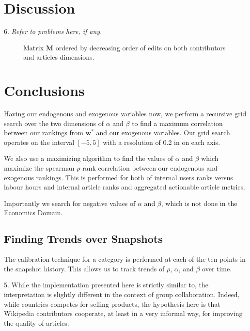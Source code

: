\documentclass{acm_proc_article-sp}
\begin{document}
\section{Discussion}

6. {\it Refer to problems here, if any.}




\begin{figure}
\centering
\caption{Matrix $\mathbf{M}$ ordered by decreasing order of edits on both contributors and articles dimensions.}
\label{fig:matrix}
\end{figure}

\section{Conclusions}


%
Having our endogenous and exogenous variables now, we perform a recursive grid search over the two dimensions of $\alpha$ and $\beta$ to find a maximum correlation between our rankings from $\mathbf{w^*}$ and our exogenous variables. Our grid search operates on the interval $[-5,5]$ with a resolution of 0.2 in on each axis.


We also use a maximizing algorithm to find the values of $\alpha$ and $\beta$ which maximize the spearman $\rho$ rank correlation between our endogenous and exogenous rankings. This is performed for both of internal users ranks versus labour hours and internal article ranks and aggregated actionable article metrics.

Importantly we search for negative values of $\alpha$ and $\beta$, which is not done in the Economics Domain.

\subsection{Finding Trends over Snapshots}

The calibration technique for a category is performed at each of the ten points in the snapshot history. This allows us to track trends of $\rho$, $\alpha$, and $\beta$ over time.



5. While the implementation presented here is strictly similar to, the interpretation is slightly different in the context of group collaboration. Indeed, while countries competes for selling products, the hypothesis here is that Wikipedia contributors cooperate, at least in a very informal way, for improving the quality of articles.
\end{document}

